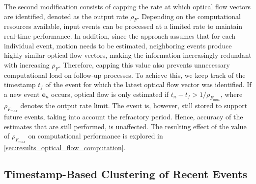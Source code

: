 The second modification consists of capping the rate at which optical flow vectors are identified, denoted as the output rate $\rho_F$. Depending on the computational resources available, input events can be processed at a limited rate to maintain real-time performance. In addition, since the approach assumes that for each individual event, motion needs to be estimated, neighboring events produce highly similar optical flow vectors, making the information increasingly redundant with increasing $\rho_F$. Therefore, capping this value also prevents unnecessary computational load on follow-up processes. To achieve this, we keep track of the timestamp $t_f$ of the event for which the latest optical flow vector was identified. If a new event $\mathbf{e}_n$ occurs, optical flow is only estimated if $t_n - t_f > 1/\rho_{F_{max}}$, where $\rho_{F_{max}}$ denotes the output rate limit. The event is, however, still stored to support future events, taking into account the refractory period. Hence, accuracy of the estimates that are still performed, is unaffected. The resulting effect of the value of $\rho_{F_{max}}$ on computational performance is explored in \cref{sec:results_optical_flow_computation}.

\subsection{Timestamp-Based Clustering of Recent Events}
\label{sec:eof_timesorting}

%

